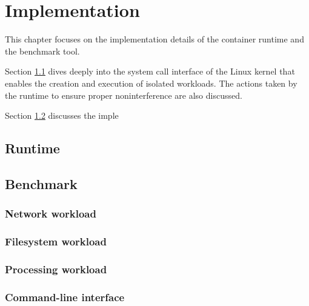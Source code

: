 \chapter{Implementation}
This chapter focuses on the implementation details of the container runtime 
and the benchmark tool. 

Section \ref{ch:implementation/runtime} dives deeply into the 
system call interface of the Linux kernel that enables the creation and execution 
of isolated workloads. The actions taken by the runtime 
to ensure proper noninterference are also discussed. 

Section \ref{ch:implementation/benchmark} discusses the imple

\label{ch:implementation}
\section{Runtime}
\label{ch:implementation/runtime}

\section{Benchmark}
\label{ch:implementation/benchmark}
\subsection{Network workload}
\subsection{Filesystem workload}
\subsection{Processing workload}
\subsection{Command-line interface}
